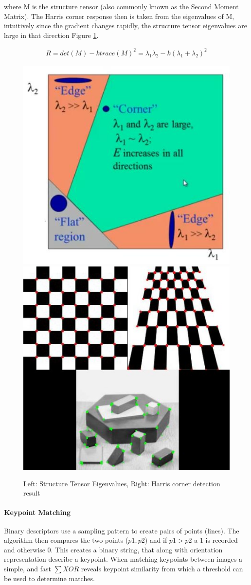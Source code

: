 \documentclass[11pt,twoside]{report}
\begin{document}
where M is the structure tensor (also commonly known as the Second Moment Matrix). The Harris corner response then is taken from the eigenvalues of M, intuitively since the gradient changes rapidly, the structure tensor eigenvalues are large in that direction Figure \ref{Harris}.


\begin{equation}
\begin{aligned}
R = det(M) - \mathit{k}trace(M)^{2} = \lambda_{1}\lambda_{2} - \mathit{k}(\lambda_{1} + \lambda_{2})^{2}
\end{aligned}
\end{equation}

\noindent \begin{figure}[H] 
	\includegraphics[width = 0.5\hsize]{figures/harris_region.jpg}
	\includegraphics[width = 0.45\hsize]{figures/harris_result.jpg}
	\caption{Left: Structure Tensor Eigenvalues, Right: Harris corner detection result \cite{opencv_harris_article} }
	\label{Harris}
\end{figure}

\paragraph{Keypoint Matching}
Binary descriptors use a sampling pattern to create pairs of points (lines). The algorithm then compares the two points ($p1,p2$) and if $p1 > p2$ a 1 is recorded and otherwise 0. This creates a binary string, that along with orientation representation describe a keypoint. When matching keypoints between images a simple, and fast $\sum XOR$ reveals keypoint similarity from which a threshold can be used to determine matches.
\end{document}
